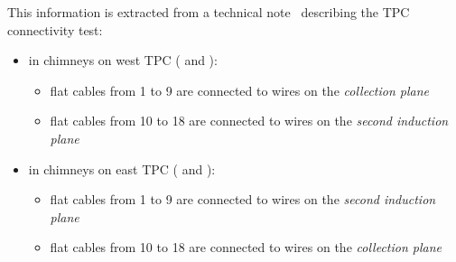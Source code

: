 This information is extracted from a technical note~\cite{SBNDocDBxxxx:ConnTest} describing the TPC connectivity test:
\begin{itemize}
  \item in chimneys on west TPC ( and ):
    \begin{itemize}
      \item flat cables from 1 to 9 are connected to wires on the \emph{collection plane}
      \item flat cables from 10 to 18 are connected to wires on the \emph{second induction plane}
    \end{itemize}
  \item in chimneys on east TPC ( and ):
    \begin{itemize}
      \item flat cables from 1 to 9 are connected to wires on the \emph{second induction plane}
      \item flat cables from 10 to 18 are connected to wires on the \emph{collection plane}
    \end{itemize}
\end{itemize}



